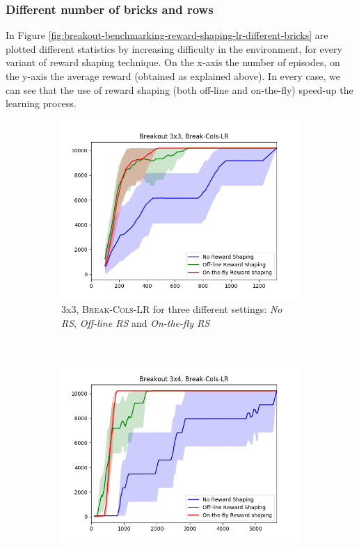 \subsubsection{Different number of bricks and rows}
In Figure \ref{fig:breakout-benchmarking-reward-shaping-lr-different-bricks} are plotted different statistics by increasing difficulty in the environment, for every variant of reward shaping technique.
On the x-axis the number of episodes, on the y-axis the average reward (obtained as explained above). In every case, we can see that the use of reward shaping (both off-line and on-the-fly) speed-up the learning process.
\begin{figure}[h]
	 \centering
	 \begin{subfigure}[b]{0.65\textwidth}
	\includegraphics[width=\textwidth]{images/rs-comparison_b33.png}
	 	\caption{\Breakout 3x3, \textsc{Break-Cols-LR} for three different settings: \emph{No RS}, \emph{Off-line RS} and \emph{On-the-fly RS}}
	 	\label{fig:breakout-benchmarking-reward-shaping-33-lr}
	 \end{subfigure}
	 ~ %
	 \begin{subfigure}[b]{0.65\textwidth}
		\includegraphics[width=\textwidth]{images/rs-comparison_b34.png}

\end{subfigure}
\end{figure}
